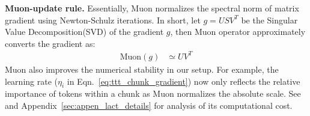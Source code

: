 \noindent\textbf{Muon-update rule.} 
Essentially, Muon normalizes the spectral norm of matrix gradient using Newton-Schulz iterations.
In short, let $g = U S V^T$ be the Singular Value Decomposition(SVD) of the gradient $g$, then Muon operator approximately converts the gradient as:
\begin{align}
    \mathrm{Muon}(g) &\simeq UV^T
\end{align}
Muon also improves the numerical stability in our setup. 
For example, 
the learning rate  ($\eta_i$ in Eqn.~\ref{eq:ttt_chunk_gradient}) now only reflects the relative importance of tokens within a chunk as Muon normalizes the absolute scale. See \cite{jordan2024muon} and Appendix~\ref{sec:appen_lact_details} for analysis of its computational cost. 


